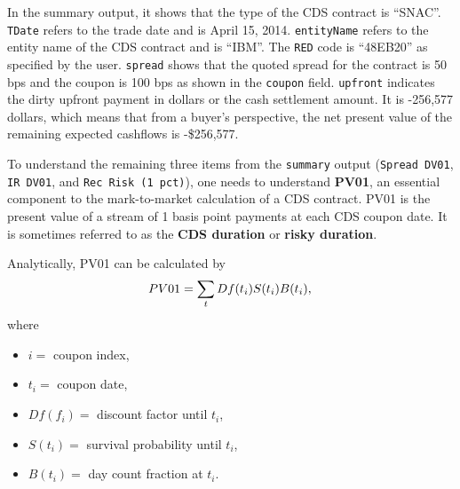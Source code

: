 \documentclass[a4paper]{article}
\begin{document}



In the summary output, it shows that the type of the CDS contract is
``SNAC''. \texttt{TDate} refers to the trade date and is April 15,
2014. \texttt{entityName} refers to the entity name of the CDS
contract and is ``IBM''. The \texttt{RED} code is ``48EB20'' as
specified by the user. \texttt{spread} shows that the quoted spread
for the contract is 50 bps and the coupon is 100 bps as shown in the
\texttt{coupon} field. \texttt{upfront} indicates the dirty upfront
payment in dollars or the cash settlement amount. It is -256,577
dollars, which means that from a buyer's perspective, the net present
value of the remaining expected cashflows is -\$256,577.

To understand the remaining three items from the \texttt{summary}
output (\texttt{Spread DV01}, \texttt{IR DV01}, and \texttt{Rec Risk
  (1 pct)}), one needs to understand \textbf{PV01}, an essential
component to the mark-to-market calculation of a CDS contract. PV01 is
the present value of a stream of 1 basis point payments at each CDS
coupon date. It is sometimes referred to as the \textbf{CDS duration}
or \textbf{risky duration}.

Analytically, PV01 can be calculated by
\begin{displaymath}
PV01 =  \sum_tDf(t_i)S(t_i)B(t_i), \nonumber\\
\end{displaymath}
where 
\begin{itemize}
\item $i =$ coupon index,
\item $t_i =$ coupon date,
\item $Df(f_i) =$ discount factor until $t_i$,
\item $S(t_i) =$ survival probability until $t_i$,
\item $B(t_i) =$ day count fraction at $t_i$.
\end{itemize}
\end{document}
